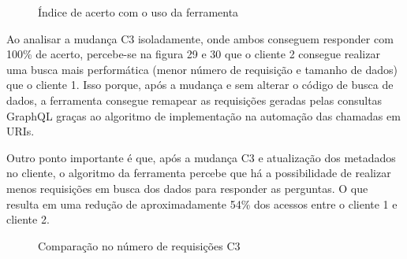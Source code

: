 \begin{figure}[H]
  \centering
  \caption{Índice de acerto com o uso da ferramenta}
\end{figure}

Ao analisar a mudança C3 isoladamente, onde ambos conseguem responder com 100\% de acerto, percebe-se na figura 29 e 30 que o cliente 2 consegue realizar uma busca mais performática (menor número de requisição e tamanho de dados) que o cliente 1. Isso porque, após a mudança e sem alterar o código de busca de dados, a ferramenta consegue remapear as requisições geradas pelas consultas GraphQL graças ao algoritmo de implementação na automação das chamadas em URIs.

Outro ponto importante é que, após a mudança C3 e atualização dos metadados no cliente, o algoritmo da ferramenta percebe que há a possibilidade de realizar menos requisições em busca dos dados para responder as perguntas. O que resulta em uma redução de aproximadamente 54\% dos acessos entre o cliente 1 e cliente 2.

\begin{figure}[H]
  \centering
  \caption{Comparação no número de requisições C3}
\end{figure}

